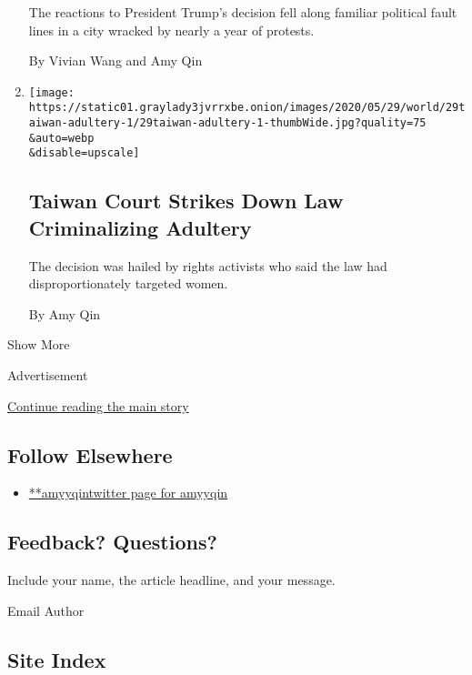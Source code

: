 \begin{enumerate}
  The reactions to President Trump's decision fell along familiar
  political fault lines in a city wracked by nearly a year of protests.

  By Vivian Wang and Amy Qin
\item
  \href{/2020/05/29/world/asia/taiwan-adultery.html}{}

  \texttt{[image: https://static01.graylady3jvrrxbe.onion/images/2020/05/29/world/29taiwan-adultery-1/29taiwan-adultery-1-thumbWide.jpg?quality=75\\\&auto=webp\\\&disable=upscale]}

  \hypertarget{taiwan-court-strikes-down-law-criminalizing-adultery}{%
  \subsection{Taiwan Court Strikes Down Law Criminalizing
  Adultery}\label{taiwan-court-strikes-down-law-criminalizing-adultery}}

  The decision was hailed by rights activists who said the law had
  disproportionately targeted women.

  By Amy Qin
\end{enumerate}

Show More

Advertisement

\protect\hyperlink{after-mid2}{Continue reading the main story}

\hypertarget{follow-elsewhere}{%
\subsection{Follow Elsewhere}\label{follow-elsewhere}}

\begin{itemize}
\tightlist
\item
  \href{https://twitter.com/amyyqin}{**amyyqintwitter page for amyyqin}
\end{itemize}

\hypertarget{feedback-questions}{%
\subsection{Feedback? Questions?}\label{feedback-questions}}

Include your name, the article headline, and your message.

Email Author

\hypertarget{site-index}{%
\subsection{Site Index}\label{site-index}}

